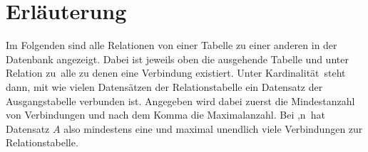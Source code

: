 \section{Erläuterung}
\label{db_erläuterung}
Im Folgenden sind alle Relationen von einer Tabelle zu einer anderen 
in der Datenbank angezeigt. Dabei ist jeweils oben die ausgehende Tabelle und 
unter \glqq Relation zu\grqq\ alle zu denen eine Verbindung existiert. Unter 
\glqq Kardinalität\grqq\ steht dann, mit wie vielen Datensätzen der 
Relationstabelle ein Datensatz der Ausgangstabelle verbunden ist. Angegeben wird 
dabei zuerst die Mindestanzahl von Verbindungen und nach dem Komma die 
Maximalanzahl. Bei ,n\grqq\ hat Datensatz $A$ also mindestens eine und 
maximal unendlich viele Verbindungen zur Relationstabelle.

